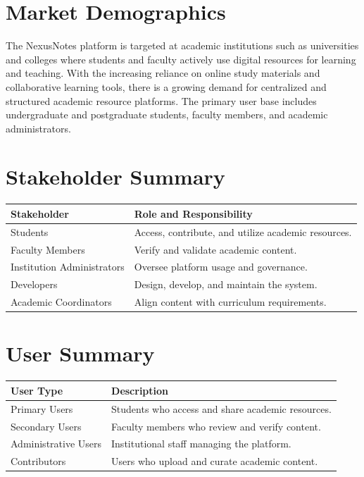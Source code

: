 \documentclass[12pt,a4paper]{report}
\begin{document}
\section{Market Demographics}
The NexusNotes platform is targeted at academic institutions such as universities and colleges where students and faculty actively use digital resources for learning and teaching. With the increasing reliance on online study materials and collaborative learning tools, there is a growing demand for centralized and structured academic resource platforms. The primary user base includes undergraduate and postgraduate students, faculty members, and academic administrators.

\section{Stakeholder Summary}

\begin{center}
\begin{tabular}{|l|p{8cm}|}
\hline
Stakeholder & Role and Responsibility \\
\hline
Students & Access, contribute, and utilize academic resources. \\
\hline
Faculty Members & Verify and validate academic content. \\
\hline
Institution Administrators & Oversee platform usage and governance. \\
\hline
Developers & Design, develop, and maintain the system. \\
\hline
Academic Coordinators & Align content with curriculum requirements. \\
\hline
\end{tabular}
\end{center}

\section{User Summary}

\begin{center}
\begin{tabular}{|l|p{8cm}|}
\hline
User Type & Description \\
\hline
Primary Users & Students who access and share academic resources. \\
\hline
Secondary Users & Faculty members who review and verify content. \\
\hline
Administrative Users & Institutional staff managing the platform. \\
\hline
Contributors & Users who upload and curate academic content. \\
\hline
\end{tabular}
\end{center}
\end{document}
